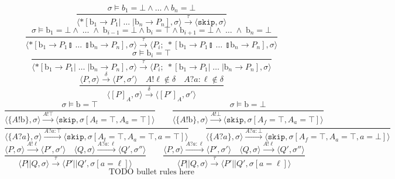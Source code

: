 \documentclass{article}
\begin{document}
$$    \frac{\sigma \models b_1 = \bot \wedge \ldots \wedge b_n = \bot}{\langle *[ \mathrm{b}_1 \rightarrow P_1  | \; \ldots \; | \mathrm{b}_n \rightarrow P_n ] , \sigma \rangle \xrightarrow{\tau} \langle \mathtt{skip} , \sigma \rangle } $$$$
    \frac{\sigma \models \mathrm{b}_1 = \bot \wedge \; \ldots \; \wedge \; \mathrm{b}_{i-1} = \bot \wedge \mathrm{b}_i = \top \wedge \mathrm{b}_{i+1} = \bot \wedge \; \ldots \; \wedge \; \mathrm{b}_n = \bot} {\langle *[ \mathrm{b}_1 \rightarrow P_1  \talloblong \; \ldots \; \talloblong \mathrm{b}_n \rightarrow P_n ] , \sigma \rangle \xrightarrow{\tau} \langle P_i; \; *[ \mathrm{b}_1 \rightarrow P_1  \talloblong \; \ldots \; \talloblong \mathrm{b}_n \rightarrow P_n ] , \sigma\rangle  } $$$$
    \frac{\sigma \models \mathrm{b}_i = \top} {\langle *[ \mathrm{b}_1 \rightarrow P_1  | \; \ldots \; | \mathrm{b}_n \rightarrow P_n ] , \sigma \rangle \xrightarrow{\tau} \langle P_i;\;*[ \mathrm{b}_1 \rightarrow P_1  | \; \ldots \; | \mathrm{b}_n \rightarrow P_n ] , \sigma\rangle  } $$$$
    \frac{\langle P, \sigma \rangle \xrightarrow{\delta} \langle P', \sigma' \rangle \quad A!\ell \not \in \delta \quad A?a:\ell \not \in \delta}{\langle [P]_A, \sigma \rangle \xrightarrow{\delta} \langle [P']_A, \sigma' \rangle} $$$$
    \frac{\sigma \models \mathrm{b} = \top}{\langle \{A!\mathrm{b}\}, \sigma \rangle \xrightarrow{A!\top} \langle \mathtt{skip}, \sigma[A_t = \top, A_a = \top] \rangle} \qquad
    \frac{\sigma \models \mathrm{b} = \bot}{\langle \{A!\mathrm{b}\}, \sigma \rangle \xrightarrow{A!\bot} \langle \mathtt{skip}, \sigma[A_f = \top, A_a = \top] \rangle} $$$$
    \frac{}{\langle \{A?a\}, \sigma \rangle \xrightarrow{A?a : \top} \langle \mathtt{skip}, \sigma[A_t = \top, A_a = \top, a = \top] \rangle} \qquad
    \frac{}{\langle \{A?a\}, \sigma \rangle \xrightarrow{A?a : \bot} \langle \mathtt{skip}, \sigma[A_f = \top, A_a = \top, a = \bot] \rangle} $$$$
    \frac{\langle P, \sigma \rangle \xrightarrow{A!\ell} \langle P', \sigma' \rangle \quad \langle Q, \sigma \rangle \xrightarrow {A?a : \ell} \langle Q', \sigma'' \rangle}{\langle P || Q, \sigma \rangle \xrightarrow{\tau} \langle P' || Q', \sigma[a = \ell] \rangle} \qquad
    \frac{\langle P, \sigma \rangle \xrightarrow{A?a : \ell} \langle P', \sigma' \rangle \quad \langle Q, \sigma \rangle \xrightarrow {A!\ell} \langle Q', \sigma'' \rangle}{\langle P || Q, \sigma \rangle \xrightarrow{\tau} \langle P' || Q', \sigma[a = \ell] \rangle}
    $$$$ \text{TODO bullet rules here}
$$
\end{document}
